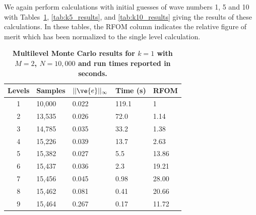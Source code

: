\documentclass[note]{TechNote}
\begin{document}
We again perform calculations with initial guesses of wave numbers 1,
5 and 10 with Tables~\ref{tab:k1_results}, \ref{tab:k5_results}, and
\ref{tab:k10_results} giving the results of these calculations. In
these tables, the RFOM column indicates the relative figure of merit
which has been normalized to the single level calculation.
\begin{table}[h!]
  \begin{center}
    \begin{tabular}{cllll}\hline\hline
      \multicolumn{1}{c}{\textbf{Levels}} & 
      \multicolumn{1}{l}{\textbf{Samples}} & 
      \multicolumn{1}{l}{\textbf{$||\ve{e}||_{\infty}$}} & 
      \multicolumn{1}{l}{\textbf{Time (s)}} & 
      \multicolumn{1}{l}{\textbf{RFOM}} \\
      \hline
      1 & 10,000 & 0.022 & 119.1 & 1 \\
      2 & 13,535 & 0.026 & 72.0 & 1.14 \\
      3 & 14,785 & 0.035 & 33.2 & 1.38 \\
      4 & 15,226 & 0.039 & 13.7 & 2.63 \\
      5 & 15,382 & 0.027 & 5.5 & 13.86 \\
      6 & 15,437 & 0.036 & 2.3 & 19.21 \\
      7 & 15,456 & 0.045 & 0.98 & 28.00 \\
      8 & 15,462 & 0.081 & 0.41 & 20.66 \\
      9 & 15,464 & 0.267 & 0.17 & 11.72 \\
      \hline\hline
    \end{tabular}
  \end{center}
  \caption{\textbf{Multilevel Monte Carlo results for $k = 1$ with $M
      = 2$, $N = 10,000$ and run times reported in seconds.}}
  \label{tab:k1_results}
\end{table}
\end{document}
